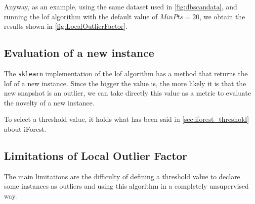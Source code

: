 Anyway, as an example, using the same dataset used in \autoref{fig:dbscandata}, and running the \gls{lof} algorithm with the default value of $MinPts=20$, we obtain the results shown in \autoref{fig:LocalOutlierFactor}.

\subsection{Evaluation of a new instance}
\label{sec:lof_eval}
The \texttt{sklearn} implementation of the \gls{lof} algorithm has a method that returns the \gls{lof} of a new instance. Since the bigger the value is, the more likely it is that the new snapshot is an outlier, we can take directly this value as a metric to evaluate the novelty of a new instance.

To select a threshold value, it holds what has been said in \autoref{sec:iforest_threshold} about iForest.


\subsection{Limitations of Local Outlier Factor}
\label{sec:lof_limitations}
The main limitations are the difficulty of defining a threshold value to declare some instances as outliers and using this algorithm in a completely unsupervised way.


